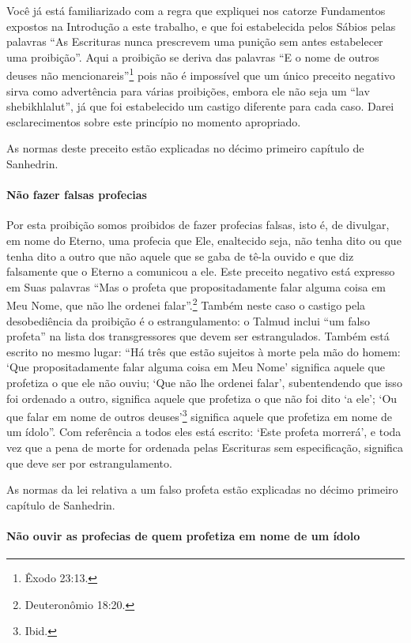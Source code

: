 Você já está familiarizado com a regra que expliquei nos catorze
Fundamentos expostos na Introdução a este trabalho, e que foi
estabelecida pelos Sábios pelas palavras ``As Escrituras nunca
prescrevem uma punição sem antes estabelecer uma proibição''. Aqui a
proibição se deriva das palavras ``E o nome de outros deuses não
mencionareis''\footnote{Êxodo 23:13.} pois não é impossível que um único
preceito negativo sirva como advertência para várias proibições, embora
ele não seja um ``lav shebikhlalut'', já que foi estabelecido um castigo
diferente para cada caso. Darei esclarecimentos sobre este princípio no
momento apropriado.

As normas deste preceito estão explicadas no décimo primeiro capítulo
de Sanhedrin.

\paragraph{Não fazer falsas profecias}

Por esta proibição somos proibidos de fazer profecias falsas, isto é,
de divulgar, em nome do Eterno, uma profecia que Ele, enaltecido seja,
não tenha dito ou que tenha dito a outro que não aquele que se gaba de tê-la
ouvido e que diz falsamente que o Eterno a comunicou a ele. Este
preceito negativo está expresso em Suas palavras ``Mas o profeta que propositadamente
falar alguma coisa em Meu Nome, que não lhe ordenei falar''.\footnote{Deuteronômio 18:20.}
Também neste caso o castigo pela desobediência da proibição é o
estrangulamento: o Talmud inclui ``um falso profeta'' na lista dos
transgressores que devem ser estrangulados. Também está escrito no mesmo
lugar: ``Há três que estão sujeitos à morte pela mão do homem: `Que propositadamente
falar alguma coisa em Meu Nome' significa aquele que profetiza o que ele
não ouviu; `Que não lhe ordenei falar', subentendendo que isso foi
ordenado a outro, significa aquele que profetiza o que não foi dito `a
ele'; `Ou que falar em nome de outros deuses'\footnote{Ibid.} significa aquele
que profetiza em nome de um ídolo''. Com referência a todos eles está
escrito: `Este profeta morrerá', e toda vez que a pena de morte for
ordenada pelas Escrituras sem especificação, significa que deve ser por
estrangulamento.

As normas da lei relativa a um falso profeta estão explicadas no décimo
primeiro capítulo de Sanhedrin.

\paragraph{Não ouvir as profecias de quem profetiza em nome de um ídolo}

